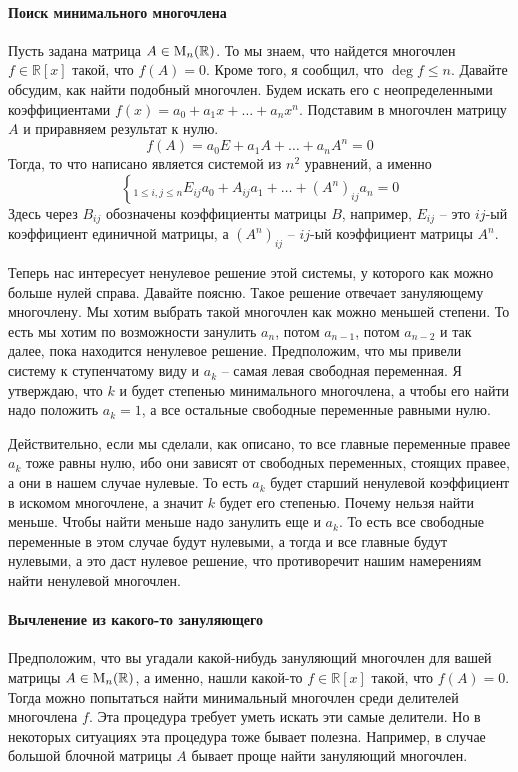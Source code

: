 \paragraph{Поиск минимального многочлена}

Пусть задана матрица $A\in \operatorname{M}_{n}(\mathbb R)$.
То мы знаем, что найдется многочлен $f\in\mathbb R[x]$ такой, что $f(A) = 0$.
Кроме того, я сообщил, что $\deg f\leqslant n$.
Давайте обсудим, как найти подобный многочлен.
Будем искать его с неопределенными коэффициентами $f(x) = a_0 + a_1 x + \ldots + a_n x^n$.
Подставим в многочлен матрицу $A$ и приравняем результат к нулю.
\[
f(A) = a_0 E + a_1 A + \ldots + a_n A^n = 0
\]
Тогда, то что написано является системой из $n^2$ уравнений, а именно
\[
\left\{_{1\leqslant i,j\leqslant n}
E_{ij}a_0 + A_{ij}a_1 + \ldots + (A^n)_{ij}a_n = 0
\right.
\]
Здесь через $B_{ij}$ обозначены коэффициенты матрицы $B$, например, $E_{ij}$ -- это $ij$-ый коэффициент единичной матрицы, а $(A^n)_{ij}$ -- $ij$-ый коэффициент матрицы $A^n$.

Теперь нас интересует ненулевое решение этой системы, у которого как можно больше нулей справа.
Давайте поясню.
Такое решение отвечает зануляющему многочлену.
Мы хотим выбрать такой многочлен как можно меньшей степени.
То есть мы хотим по возможности занулить $a_n$, потом $a_{n-1}$, потом $a_{n-2}$ и так далее, пока находится ненулевое решение.
Предположим, что мы привели систему к ступенчатому виду и $a_k$ -- самая левая свободная переменная.
Я утверждаю, что $k$ и будет степенью минимального многочлена, а чтобы его найти надо положить $a_k = 1$, а все остальные свободные переменные равными нулю.

Действительно, если мы сделали, как описано, то все главные переменные правее $a_k$ тоже равны нулю, ибо они зависят от свободных переменных, стоящих правее, а они в нашем случае нулевые.
То есть $a_k$ будет старший ненулевой коэффициент в искомом многочлене, а значит $k$ будет его степенью.
Почему нельзя найти меньше.
Чтобы найти меньше надо занулить еще и $a_k$.
То есть все свободные переменные в этом случае будут нулевыми, а тогда и все главные будут нулевыми, а это даст нулевое решение, что противоречит нашим намерениям найти ненулевой многочлен.

\paragraph{Вычленение из какого-то зануляющего}

Предположим, что вы угадали какой-нибудь зануляющий многочлен для вашей матрицы $A\in\operatorname{M}_{n}(\mathbb R)$, а именно, нашли какой-то $f\in \mathbb R[x]$ такой, что $f(A) = 0$.
Тогда можно попытаться найти минимальный многочлен среди делителей многочлена $f$.
Эта процедура требует уметь искать эти самые делители.
Но в некоторых ситуациях эта процедура тоже бывает полезна.
Например, в случае большой блочной матрицы $A$ бывает проще найти зануляющий многочлен.

